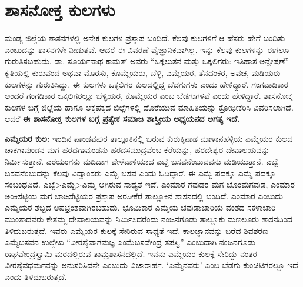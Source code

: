 \section*{ಶಾಸನೋಕ್ತ ಕುಲಗಳು}

ಮಂಡ್ಯ ಜಿಲ್ಲೆಯ ಶಾಸನಗಳಲ್ಲಿ ಅನೇಕ ಕುಲಗಳ ಪ್ರಸ್ತಾಪ ಬಂದಿದೆ. ಕೆಲವು ಕುಲಗಳಿಗೆ ಆ ಹೆಸರು ಹೇಗೆ ಬಂದಿತು ಎಂಬುದನ್ನು ಶಾಸನಗಳೇ ನೀಡುತ್ತವೆ. ಆದರೆ ಈ ವಿವರಣೆ ವೈಜ್ಞಾನಿಕವಾಗಿಲ್ಲ. ಇನ್ನು ಕೆಲವು ಕುಲಗಳನ್ನು ಈಗಲೂ ಗುರುತಿಸಬಹುದು. ಡಾ. ಸೂರ್ಯನಾಥ ಕಾಮತ್​ ಅವರು “ಒಕ್ಕಲುತನ ಮತ್ತು ಒಕ್ಕಲಿಗರು: ಇತಿಹಾಸ ಅನ್ವೇಷಣೆ” ಕೃತಿಯಲ್ಲಿ ಕುರುವಂದ ಅಥವಾ ಮೊರಸು, ಕೊಮ್ಮೆಯರು, ಬೆಳ್ಳಿ, ಎಮ್ಮೆಯರ, ತೆನದಂಕರ, ಅವಚ, ಮಡಿಯರು ಕುಲಗಳನ್ನು ಗುರುತಿಸಿದ್ದು, ಈ ಕುಲಗಳು ಒಕ್ಕಲಿಗರ ಕುಲದಲ್ಲಿದ್ದ ಬೆಡಗುಗಳು ಎಂದು ಹೇಳಿದ್ದಾರೆ. ಗಂಗವಾಡಿಕಾರ ಅಂದರೆ ಗಂಗಡಿಕಾರ ಒಕ್ಕಲಿಗರಲ್ಲೂ ಬೆಳ್ಳಿಯರ, ಕೊಮ್ಮೆಯರ ಎಂಬ ಬೆಡಗುಗಳಿವೆ ಎಂದು ಹೇಳಿದ್ದಾರೆ. ಶಾಸನೋಕ್ತ ಕುಲಗಳ ಬಗ್ಗೆ ಜಿಲ್ಲೆಯ ಹಾಗೂ ಅಕ್ಕಪಕ್ಕದ ಜಿಲ್ಲೆಗಳಲ್ಲಿ ದೊರೆಯುವ ಮಾಹಿತಿಯನ್ನು ಕ್ರೋಢೀಕರಿಸಿ ವಿವರಿಸಲಾಗಿದೆ. ಆದರೆ \textbf{ಈ ಶಾಸನೋಕ್ತ ಕುಲಗಳ ಬಗ್ಗೆ ಪ್ರತ್ಯೇಕ ಸಮಾಜ\general{\break } ಶಾಸ್ತ್ರೀಯ ಅಧ್ಯಯನದ ಅಗತ್ಯ ಇದೆ.}

\textbf{ಎಮ್ಮೆಯರ ಕುಲ:} ಇಂದಿನ ಪಾಂಡವಪುರ ತಾಲ್ಲೂಕಿನಲ್ಲಿ ಬರುವ ಕುರುಕ್ಕಿನಾಡ ಮಾಳಾನಹಳ್ಳಿಯ ಎಮ್ಮೆಯರ ಕುಲದ ಚಾಕಗಾವುಂಡನ ಮಗ ಹರದಗಾವುಂಡನು ಹರದಸಮುದ್ರವೆಂಬ ಕೆರೆಯನ್ನು, ಹರದೇಶ್ವರ ದೇವಾಲಯವನ್ನು ನಿರ್ಮಿಸುತ್ತಾನೆ. ಎರೆಯಂಗನು ಮಡಿದಾಗ ವೇಳೆವಾಳಿ\-ಯಾದ ಎಬ್ಬೆ ಬಸವನೆಂಬುವವನು ಮಡಿಯುತ್ತಾನೆ. ಎಬ್ಬೆ ಬಸವನೆಂಬುದನ್ನು ಕೆಲವು ವಿದ್ವಾಂಸರು ಎಮ್ಬೆ ಬಸವ ಎಂದು ಓದಿದ್ದಾರೆ. ಈ ಎಮ್ಬೆ ಪದಕ್ಕೂ ಎಮ್ಮೆ ಪದಕ್ಕೂ ಸಂಬಂಧವಿದೆ. ಎಬ್ಬೆ\textgreater ಎಮ್ಬೆ\textgreater ಎಮ್ಮೆ ಆಗಿರುವ ಸಾಧ್ಯತೆ ಇದೆ. ಎಂಮಾರ ಗವುಡರ ಮಗ ಬೊಂಮಗವುಡ, ಎಂಮಾರ ಅಂಕಿಸೆಟ್ಟಿಯ ಮಗ ಬಾಚಿಸೆಟ್ಟಿಯರ ಪ್ರಸ್ತಾಪ ಅರಸೀಕೆರೆ ತಾಲ್ಲೂಕಿನ ಶಾಸನದಲ್ಲಿ ಬಂದಿದೆ. ಎಂಮಾರ ಎಂಬುದು ಎಮ್ಮೆಯರ ಶಬ್ದದ ಅಪಭ್ರಂಶವಾಗಿರಬಹುದು. ಭೂಮಿಕಾರ ಎಮ್ಮೆಯ ಚವುಡಾಚಾರಿಯ ವಂಶದ ಸಕಳಾಚಾರಿ ಮುಂತಾದವರು ಕೇತಮ್ಮ ದೇವಾಲಯವನ್ನು ನಿರ್ಮಿಸಿದರೆಂದು ನಂಜನಗೂಡು ತಾಲ್ಲೂಕು ಮಣಲೂರು ಶಾಸನದಿಂದ ತಿಳಿದುಬರುತ್ತದೆ. ಇವರು ಎಮ್ಮೆಯರ ಕುಲಕ್ಕೆ ಸೇರಿರುವ ಸಾಧ್ಯತೆ ಇದೆ. ಕಾಲಜ್ಞಾನವನ್ನು ಬರೆದ ಶಿವಶರಣ ಎಮ್ಮೆಬಸವನ ಉಲ್ಲೇಖ “ವೀರಶೈವಾಗಮಜ್ಞ ಎಂಮೆಬಸವೇಂದ್ರ ತಪಸ್ವಿ” ಎಂಬುದಾಗಿ ನಂಜನಗೂಡು ರಾಘವೇಂದ್ರಸ್ವಾಮಿ ಮಠದಲ್ಲಿರುವ ತಾಮ್ರಶಾಸನದಲ್ಲಿದೆ. ಇವನು ಎಮ್ಮೆಯರ ಕುಲಕ್ಕೆ ಸೇರಿದ್ದು ನಂತರ ವೀರಶೈವಧರ್ಮವನ್ನು ಅನುಸರಿಸಿದನೇ ಎಂಬುದು ವಿಚಾರಾರ್ಹ. ‘ಎಮ್ಮೆನವರು’ ಎಂಬ ಬೆಡಗು ಕುಂಚಿಟಿಗರಲ್ಲೂ ಇದೆ ಎಂದು ತಿಳಿದುಬರುತ್ತದೆ.

